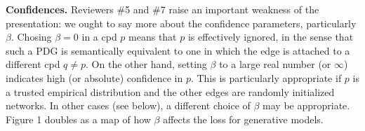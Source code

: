 \documentclass{article}
\theoremstyle{plain}
\theoremstyle{definition}
\newcommand\revc[1]{{\color{revcolor}#1}}
\begin{document}
\textbf{Confidences.}
\revc{Reviewers \#5} and \revc{\#7} raise an important weakness of the presentation: we ought to say more about the confidence parameters, particularly $\beta$.
Chosing $\beta=0$ in a cpd $p$
means that $p$ is effectively ignored, in the sense that such a PDG is semantically equivalent to one in which the edge is attached to a different cpd $q \ne p$.
On the other hand, setting $\beta$ to a large real number (or $\infty$) indicates high (or absolute) confidence in $p$.  This is particularly appropriate if $p$ is a trusted empirical distribution
and the other edges are randomly initialized networks.
In other cases (see below), a different choice of $\beta$ may be appropriate.
Figure 1 doubles as a map of how $\beta$
affects the loss for generative models.
\end{document}

